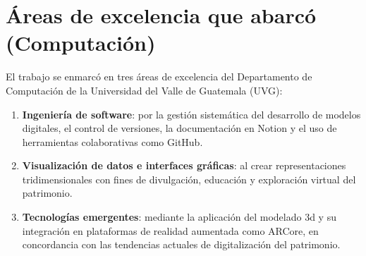 \section{Áreas de excelencia que abarcó (Computación)}
El trabajo se enmarcó en tres áreas de excelencia del Departamento de Computación de la Universidad del Valle de Guatemala (UVG):
\begin{enumerate}
    \item \textbf{Ingeniería de software}: por la gestión sistemática del desarrollo de modelos digitales, el control de versiones, la documentación en Notion y el uso de herramientas colaborativas como GitHub.
    \item \textbf{Visualización de datos e interfaces gráficas}: al crear representaciones tridimensionales con fines de divulgación, educación y exploración virtual del patrimonio.
    \item \textbf{Tecnologías emergentes}: mediante la aplicación del modelado \gls{3d} y su integración en plataformas de realidad aumentada como \gls{ARCore}, en concordancia con las tendencias actuales de digitalización del patrimonio.
\end{enumerate}